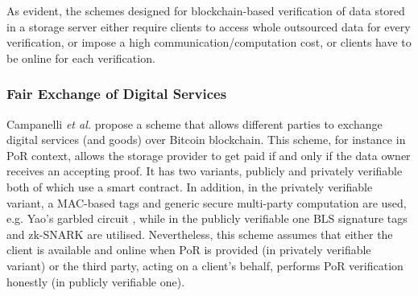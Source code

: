 As evident,  the schemes designed for  blockchain-based verification of data stored in a storage server either require clients to access  whole outsourced data for  every verification, or impose a high communication/computation cost, or  clients have to be online for each verification. 

 \subsubsection{Fair Exchange of Digital Services}
 
 Campanelli \textit{et al.}  \cite{CampanelliGGN17} propose a scheme that allows different parties to exchange digital services (and goods) over Bitcoin blockchain. This scheme, for instance in PoR context, allows the storage provider to get paid  if and only if the data owner receives an accepting proof. It has two variants, publicly and  privately verifiable both of which use a smart contract.   In addition, in the privately verifiable variant, a MAC-based tags and generic secure multi-party computation are used, e.g. Yao's garbled circuit \cite{Yao82b}, while in the publicly verifiable one  BLS signature tags and zk-SNARK are utilised.  Nevertheless, this scheme assumes that either the client is  available and online when PoR is provided (in privately verifiable variant) or the third party, acting on a client's behalf, performs PoR verification honestly (in publicly verifiable one). 












